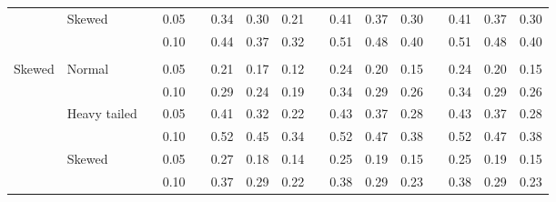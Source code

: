 \documentclass[11pt]{article} %
\begin{document}
\begin{table}[ht]
\begin{scriptsize}
\begin{center}
\begin{tabular}{ll p{.1cm} c p{.1cm} rrr p{.1cm} rrr p{.1cm} rrr}
             & Skewed       && 0.05 &&  0.34 & 0.30 & 0.21 && 0.41 & 0.37 & 0.30 && 0.41 & 0.37 & 0.30 \\ 
             &              && 0.10 &&  0.44 & 0.37 & 0.32 && 0.51 & 0.48 & 0.40 && 0.51 & 0.48 & 0.40 \\ 
             &&&&&&&&&&&&&&&\\
Skewed       & Normal       && 0.05 &&  0.21 & 0.17 & 0.12 && 0.24 & 0.20 & 0.15 && 0.24 & 0.20 & 0.15 \\ 
             &              && 0.10 &&  0.29 & 0.24 & 0.19 && 0.34 & 0.29 & 0.26 && 0.34 & 0.29 & 0.26 \\ 
             & Heavy tailed && 0.05 &&  0.41 & 0.32 & 0.22 && 0.43 & 0.37 & 0.28 && 0.43 & 0.37 & 0.28 \\ 
             &              && 0.10 &&  0.52 & 0.45 & 0.34 && 0.52 & 0.47 & 0.38 && 0.52 & 0.47 & 0.38 \\ 
             & Skewed       && 0.05 &&  0.27 & 0.18 & 0.14 && 0.25 & 0.19 & 0.15 && 0.25 & 0.19 & 0.15 \\ 
             &              && 0.10 &&  0.37 & 0.29 & 0.22 && 0.38 & 0.29 & 0.23 && 0.38 & 0.29 & 0.23 \\ 




\end{tabular}
\end{center}
\end{scriptsize}
\end{table}
\end{document}
